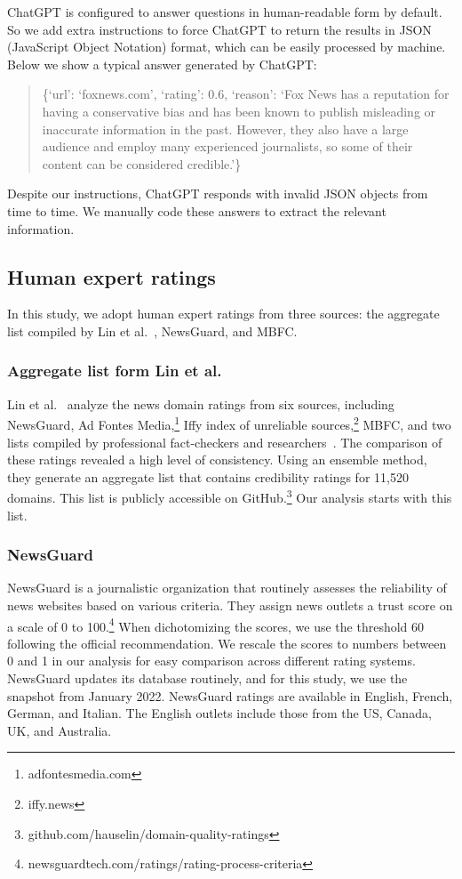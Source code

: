 \documentclass{article}
\begin{document}
ChatGPT is configured to answer questions in human-readable form by default.
So we add extra instructions to force ChatGPT to return the results in JSON (JavaScript Object Notation) format, which can be easily processed by machine.
Below we show a typical answer generated by ChatGPT:

\begin{quote}
\{`url': `foxnews.com', `rating': 0.6, `reason': `Fox News has a reputation for having a conservative bias and has been known to publish misleading or inaccurate information in the past. However, they also have a large audience and employ many experienced journalists, so some of their content can be considered credible.'\}
\end{quote}
Despite our instructions, ChatGPT responds with invalid JSON objects from time to time.
We manually code these answers to extract the relevant information.

\subsection{Human expert ratings}

In this study, we adopt human expert ratings from three sources: the aggregate list compiled by Lin et al.~\cite{lin2022high}, NewsGuard, and MBFC.

\subsubsection{Aggregate list form Lin et al.}

Lin et al.~\cite{lin2022high} analyze the news domain ratings from six sources, including NewsGuard, Ad Fontes Media,\footnote{adfontesmedia.com} Iffy index of unreliable sources,\footnote{iffy.news} MBFC, and two lists compiled by professional fact-checkers and researchers~\cite{pennycook2019fighting,lasser2022social}.
The comparison of these ratings revealed a high level of consistency.
Using an ensemble method, they generate an aggregate list that contains credibility ratings for 11,520 domains. This list is publicly accessible on  GitHub.\footnote{github.com/hauselin/domain-quality-ratings}
Our analysis starts with this list.

\subsubsection{NewsGuard}

NewsGuard is a journalistic organization that routinely assesses the reliability of news websites based on various criteria.
They assign news outlets a trust score on a scale of 0 to 100.\footnote{newsguardtech.com/ratings/rating-process-criteria}
When dichotomizing the scores, we use the threshold 60 following the official recommendation.
We rescale the scores to numbers between 0 and 1 in our analysis for easy comparison across different rating systems.
NewsGuard updates its database routinely, and for this study, we use the snapshot from January 2022.
NewsGuard ratings are available in English, French, German, and Italian.
The English outlets include those from the US, Canada, UK, and Australia.
\end{document}
